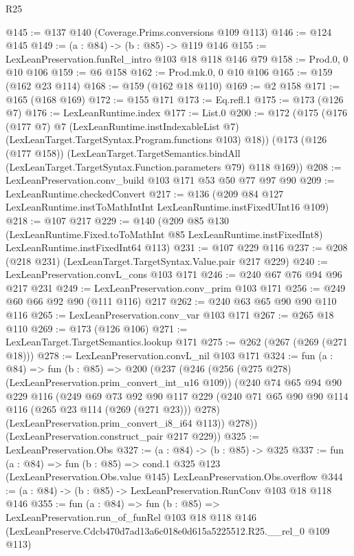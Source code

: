 \begin{lexlean}{R25}
\begin{coremodule}
@145 := @137 @140 (Coverage.Prims.conversions @109 @113)
@146 := @124 @145
@149 := (a : @84) -> (b : @85) -> @119 @146
@155 := LexLeanPreservation.funRel_intro @103 @18 @118 @146 @79
@158 := Prod.{0, 0} @10 @106
@159 := @6 @158
@162 := Prod.mk.{0, 0} @10 @106
@165 := @159 (@162 @23 @114)
@168 := @159 (@162 @18 @110)
@169 := @2 @158
@171 := @165 (@168 @169)
@172 := @155 @171
@173 := Eq.refl.{1}
@175 := @173 (@126 @7)
@176 := LexLeanRuntime.index
@177 := List.{0}
@200 := @172
    (@175
      (@176
        (@177 @7)
        @7
        (LexLeanRuntime.instIndexableList @7)
        (LexLeanTarget.TargetSyntax.Program.functions @103)
        @18))
    (@173
      (@126 (@177 @158))
      (LexLeanTarget.TargetSemantics.bindAll
        (LexLeanTarget.TargetSyntax.Function.parameters @79)
        @118
        @169))
@208 := LexLeanPreservation.conv_build @103 @171 @53 @50 @77 @97 @90
@209 := LexLeanRuntime.checkedConvert
@217 := @136 (@209 @84 @127 LexLeanRuntime.instToMathIntInt LexLeanRuntime.instFixedUInt16 @109)
@218 := @107 @217
@229 := @140
    (@209
      @85
      @130
      (LexLeanRuntime.Fixed.toToMathInt @85 LexLeanRuntime.instFixedInt8)
      LexLeanRuntime.instFixedInt64
      @113)
@231 := @107 @229 @116
@237 := @208 (@218 @231) (LexLeanTarget.TargetSyntax.Value.pair @217 @229)
@240 := LexLeanPreservation.convL_cons @103 @171
@246 := @240 @67 @76 @94 @96 @217 @231
@249 := LexLeanPreservation.conv_prim @103 @171
@256 := @249 @60 @66 @92 @90 (@111 @116) @217
@262 := @240 @63 @65 @90 @90 @110 @116
@265 := LexLeanPreservation.conv_var @103 @171
@267 := @265 @18 @110
@269 := @173 (@126 @106)
@271 := LexLeanTarget.TargetSemantics.lookup @171
@275 := @262 (@267 (@269 (@271 @18)))
@278 := LexLeanPreservation.convL_nil @103 @171
@324 := fun (a : @84) =>
  fun (b : @85) =>
  @200
    (@237
      (@246
        (@256 (@275 @278) (LexLeanPreservation.prim_convert_int_u16 @109))
        (@240
          @74
          @65
          @94
          @90
          @229
          @116
          (@249
            @69
            @73
            @92
            @90
            @117
            @229
            (@240 @71 @65 @90 @90 @114 @116 (@265 @23 @114 (@269 (@271 @23))) @278)
            (LexLeanPreservation.prim_convert_i8_i64 @113))
          @278))
      (LexLeanPreservation.construct_pair @217 @229))
@325 := LexLeanPreservation.Obs
@327 := (a : @84) -> (b : @85) -> @325
@337 := fun (a : @84) =>
  fun (b : @85) =>
  cond.{1} @325 @123 (LexLeanPreservation.Obs.value @145) LexLeanPreservation.Obs.overflow
@344 := (a : @84) -> (b : @85) -> LexLeanPreservation.RunConv @103 @18 @118 @146
@355 := fun (a : @84) =>
  fun (b : @85) =>
  LexLeanPreservation.run_of_funRel
    @103
    @18
    @118
    @146
    (LexLeanPreserve.Cdcb470d7ad13a6c018e0d615a5225512.R25.__rel_0 @109 @113)
\end{coremodule}
\end{lexlean}
